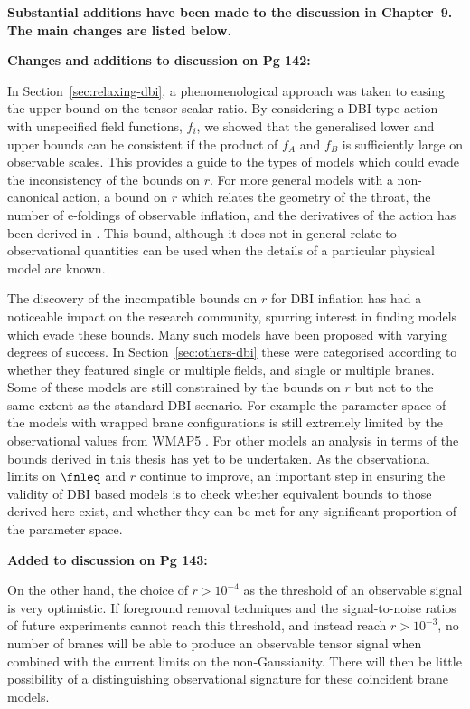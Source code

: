 \textbf{Substantial additions have been made to the discussion in Chapter~9. The main changes are
listed below.}

\textbf{Changes and additions to discussion on Pg 142:}

In Section~\ref{sec:relaxing-dbi}, a phenomenological approach was taken to easing
the upper bound on the tensor-scalar ratio. By considering a DBI-type action with unspecified field
functions,
$f_i$, we showed that the generalised lower and upper bounds can be consistent
if the product of $f_A$ and $f_B$ is sufficiently large on observable scales. This provides a guide
to the types of models which could evade the inconsistency of the bounds on $r$. For more general
models with a non-canonical action, a bound on $r$ which relates the geometry of the throat, the
number of e-foldings of observable inflation, and the derivatives of the action has been derived in
. This bound, although it does not in general relate to observational quantities can
be used when the details of a particular physical model are known.

The discovery of the incompatible bounds on $r$ for DBI inflation has had a noticeable
impact on the research community, spurring interest in finding models which evade
these bounds. Many such models have been proposed with varying degrees of success. In
Section~\ref{sec:others-dbi} these were categorised according to whether they
featured single or multiple fields, and single or multiple branes. Some of these models are still
constrained by the bounds on $r$ but not to the same extent as the standard DBI scenario. For
example the parameter space of the models with wrapped brane configurations is still extremely
limited by the observational values from WMAP5 \cite{Alabidi:2008ej}. For other models an analysis
in terms of the bounds derived in this thesis has yet to be undertaken. As the observational limits
on $\fnleq$ and $r$ continue to improve, an important step in ensuring the validity of DBI based
models is to check whether equivalent bounds to those derived here exist, and whether they can be
met for any significant proportion of the parameter space.


\textbf{Added to discussion on Pg 143:}

On the other hand, the choice of $r>10^{-4}$ as the threshold of an observable signal is very
optimistic. If foreground removal techniques and the signal-to-noise ratios of future experiments
cannot reach this threshold, and instead reach $r>10^{-3}$, no number of branes will be able to
produce an observable tensor signal when combined with the current limits on the non-Gaussianity.
There will then be little possibility of a distinguishing
observational signature for these coincident brane models.

